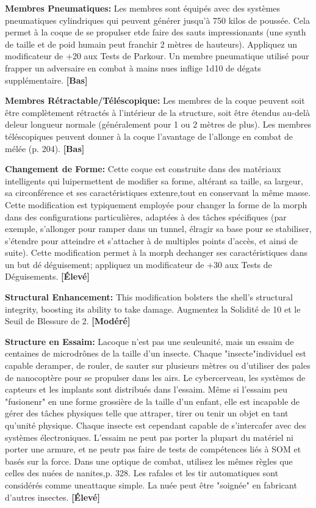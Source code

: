 \textbf{Membres Pneumatiques:} Les membres sont équipés avec des systèmes pneumatiques cylindriques qui peuvent générer jusqu'à 750 kilos de poussée. Cela permet à la coque de se propulser etde faire des sauts impressionants (une synth de taille et de poid humain peut franchir 2 mètres de hauteurs). Appliquez un modificateur de +20 aux Tests de Parkour. Un membre pneumatique utilisé pour frapper un adversaire en combat à mains nues inflige 1d10 de dégats supplémentaire. \textbf{[Bas]} 

\textbf{Membres Rétractable/Téléscopique:} Les membres de la coque peuvent soit être complètement rétractés à l'intérieur de la structure, soit être étendus au-delà deleur longueur normale (généralement pour 1 ou 2 mètres de plus). Les membres téléscopiques peuvent donner à la coque l'avantage de l'allonge en combat de mélée (p. 204). \textbf{[Bas]} 

\textbf{Changement de Forme:} Cette coque est construite dans des matériaux intelligents qui luipermettent de modifier sa forme, altérant sa taille, sa largeur, sa circonférence et ses caractéristiques extenre,tout en conservant la même masse. Cette modification est typiquement employée pour changer la forme de la morph dans des configurations particulières, adaptées à des tâches spécifiques (par exemple, s'allonger pour ramper dans un tunnel, élragir sa base pour se stabiliser, s'étendre pour atteindre et s'attacher à de multiples points d'accès, et ainsi de suite). Cette modification permet à la morph dechanger ses caractéristiques dans un but dé déguisement; appliquez un modificateur de +30 aux Tests de Déguisements. \textbf{[Élevé]} 

\textbf{Structural Enhancement:} This modification bolsters the shell’s structural integrity, boosting its ability to take damage. Augmentez la Solidité de 10 et le Seuil de Blessure de 2. \textbf{[Modéré]} 

\textbf{Structure en Essaim:} Lacoque n'est pas une seuleunité, mais un essaim de centaines de microdrônes de la taille d'un insecte. Chaque "insecte"individuel est capable deramper, de rouler, de sauter sur plusieurs mètres ou d'utiliser des pales de nanocoptère pour se propulser dans les airs. Le cybercerveau, les systèmes de capteurs et les implants sont distribués dans l'essaim. Même si l'essaim peu "fusionenr" en une forme grossière de la taille d'un enfant, elle est incapable de gérer des tâches physiques telle que attraper, tirer ou tenir un objet en tant qu'unité physique. Chaque insecte est cependant capable de s'intercafer avec des systèmes électroniques. L'essaim ne peut pas porter la plupart du matériel ni porter une armure, et ne peutr pas faire de tests de compétences liés à SOM et basés sur la force. Dans une optique de combat, utilisez les mêmes règles que celles des nuées de nanites,p. 328. Les rafales et les tir automatiques sont considérés comme uneattaque simple. La nuée peut être "soignée" en fabricant d'autres insectes. \textbf{[Élevé]} 

